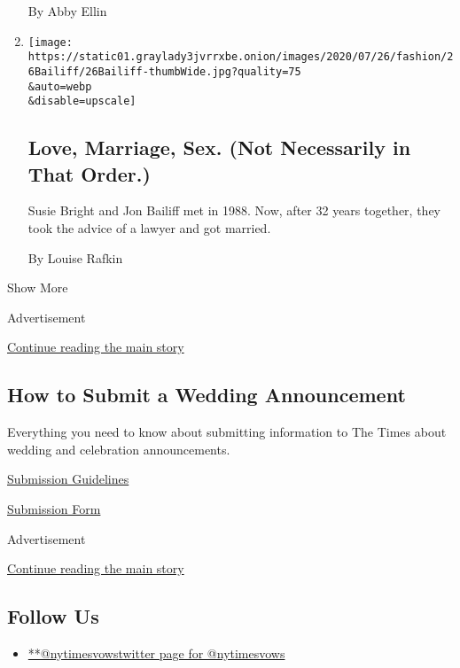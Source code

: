\begin{enumerate}
  By Abby Ellin
\item
  \href{/2020/07/24/fashion/weddings/love-marriage-sex-not-necessarily-in-that-order.html}{}

  \texttt{[image: https://static01.graylady3jvrrxbe.onion/images/2020/07/26/fashion/26Bailiff/26Bailiff-thumbWide.jpg?quality=75\\\&auto=webp\\\&disable=upscale]}

  \hypertarget{love-marriage-sex-not-necessarily-in-that-order}{%
  \subsection{Love, Marriage, Sex. (Not Necessarily in That
  Order.)}\label{love-marriage-sex-not-necessarily-in-that-order}}

  Susie Bright and Jon Bailiff met in 1988. Now, after 32 years
  together, they took the advice of a lawyer and got married.

  By Louise Rafkin
\end{enumerate}

Show More

Advertisement

\protect\hyperlink{after-mid5}{Continue reading the main story}

\hypertarget{how-to-submit-a-wedding-announcement}{%
\subsection{How to Submit a Wedding
Announcement}\label{how-to-submit-a-wedding-announcement}}

Everything you need to know about submitting information to The Times
about wedding and celebration announcements.

\href{https://www.nytimes3xbfgragh.onion/2018/01/09/fashion/weddings/wedding-submission-faqs.html}{Submission
Guidelines}

\href{http://www.nytimes3xbfgragh.onion/style/weddings/announcements}{Submission
Form}

Advertisement

\protect\hyperlink{after-mktg}{Continue reading the main story}

\hypertarget{follow-us}{%
\subsection{Follow Us}\label{follow-us}}

\begin{itemize}
\tightlist
\item
  \href{https://twitter.com/nytimesvows}{**@nytimesvowstwitter page for
  @nytimesvows}
\end{itemize}

